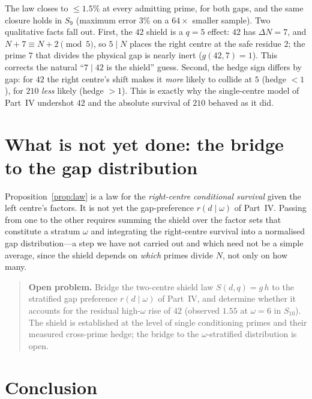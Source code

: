 \documentclass[11pt]{article}
\begin{document}
The law closes to $\leq1.5\%$ at every admitting prime, for both gaps, and the
same closure holds in $S_9$ (maximum error $3\%$ on a $64\times$ smaller sample).
Two qualitative facts fall out. First, the $42$ shield is a $q=5$ effect: $42$
has $\Delta N=7$, and $N+7\equiv N+2\pmod5$, so $5\mid N$ places the right centre
at the safe residue $2$; the prime $7$ that divides the physical gap is nearly
inert ($g(42,7)=1$). This corrects the natural ``$7\mid42$ is the shield'' guess.
Second, the hedge sign differs by gap: for $42$ the right centre's shift makes it
\emph{more} likely to collide at $5$ (hedge $<1$), for $210$ \emph{less} likely
(hedge $>1$). This is exactly why the single-centre model of Part~IV undershot
$42$ and the absolute survival of $210$ behaved as it did.

\section{What is not yet done: the bridge to the gap distribution}

Proposition~\ref{prop:law} is a law for the \emph{right-centre conditional
survival} given the left centre's factors. It is not yet the gap-preference
$r(d\mid\omega)$ of Part~IV. Passing from one to the other requires summing the
shield over the factor sets that constitute a stratum $\omega$ and integrating
the right-centre survival into a normalised gap distribution---a step we have not
carried out and which need not be a simple average, since the shield depends on
\emph{which} primes divide $N$, not only on how many.

\begin{quote}
\textbf{Open problem.} Bridge the two-centre shield law $S(d,q)=g\,h$ to the
stratified gap preference $r(d\mid\omega)$ of Part~IV, and determine whether it
accounts for the residual high-$\omega$ rise of $42$ (observed $1.55$ at
$\omega=6$ in $S_{10}$). The shield is established at the level of single
conditioning primes and their measured cross-prime hedge; the bridge to the
$\omega$-stratified distribution is open.
\end{quote}

\section{Conclusion}
\end{document}
